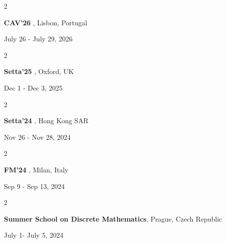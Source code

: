 \documentclass[10pt, letterpaper]{article}
\newenvironment{twocolentry}[2][]{
    \onecolentry
    \def\secondColumn{#2}
    \setcolumnwidth{\fill, 4.5 cm}
    \begin{paracol}{2}
}{
    \switchcolumn \raggedleft \secondColumn
    \end{paracol}
    \endonecolentry
} %
\begin{document}
        \vspace{0.1 cm}
        \begin{twocolentry}{
            July 26 - July 29, 2026
        }
        \textbf{CAV'26} , Lisbon, Portugal
        \end{twocolentry}

        \vspace{0.1 cm}

     \begin{twocolentry}{
            Dec 1 - Dec 3, 2025
        }
        \textbf{Setta'25} , Oxford, UK
        \end{twocolentry}

        \vspace{0.1 cm}

        \begin{twocolentry}{
            Nov 26 - Nov 28, 2024
        }
        \textbf{Setta'24} , Hong Kong SAR
        \end{twocolentry}

        \vspace{0.1 cm}
    
    \begin{twocolentry}{
            Sep 9 - Sep 13, 2024
        }
        \textbf{FM'24} , Milan, Italy
        \end{twocolentry}

        \vspace{0.1 cm}
    
    \begin{twocolentry}{
            July 1- July 5, 2024
        }
        \textbf{Summer School on Discrete Mathematics}, Prague, Czech Republic
        \end{twocolentry}
    
    
\end{document}
